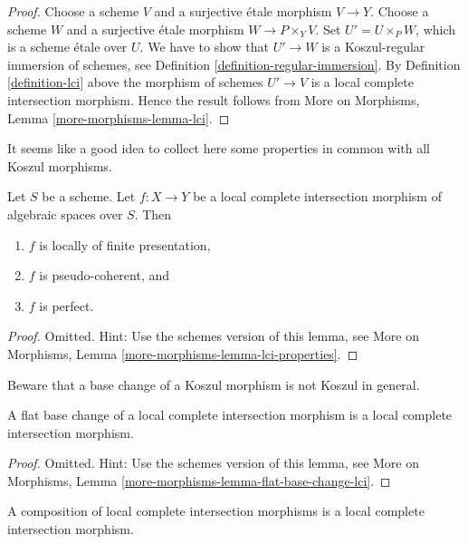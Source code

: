 \begin{proof}
Choose a scheme $V$ and a surjective \'etale morphism $V \to Y$.
Choose a scheme $W$ and a surjective \'etale morphism $W \to P \times_Y V$.
Set $U' = U \times_P W$, which is a scheme \'etale over $U$.
We have to show that $U' \to W$ is a Koszul-regular immersion of
schemes, see
Definition \ref{definition-regular-immersion}.
By
Definition \ref{definition-lci}
above the morphism of schemes $U' \to V$ is a local complete intersection
morphism. Hence the result follows from
More on Morphisms, Lemma \ref{more-morphisms-lemma-lci}.
\end{proof}

\noindent
It seems like a good idea to collect here some properties in common
with all Koszul morphisms.

\begin{lemma}
\label{lemma-lci-properties}
Let $S$ be a scheme. Let $f : X \to Y$ be a local complete intersection
morphism of algebraic spaces over $S$. Then
\begin{enumerate}
\item $f$ is locally of finite presentation,
\item $f$ is pseudo-coherent, and
\item $f$ is perfect.
\end{enumerate}
\end{lemma}

\begin{proof}
Omitted. Hint: Use the schemes version of this lemma, see
More on Morphisms,
Lemma \ref{more-morphisms-lemma-lci-properties}.
\end{proof}

\noindent
Beware that a base change of a Koszul morphism is not Koszul in general.

\begin{lemma}
\label{lemma-flat-base-change-lci}
A flat base change of a local complete intersection morphism is a
local complete intersection morphism.
\end{lemma}

\begin{proof}
Omitted. Hint: Use the schemes version of this lemma, see
More on Morphisms,
Lemma \ref{more-morphisms-lemma-flat-base-change-lci}.
\end{proof}

\begin{lemma}
\label{lemma-composition-lci}
A composition of local complete intersection morphisms is a
local complete intersection morphism.
\end{lemma}

